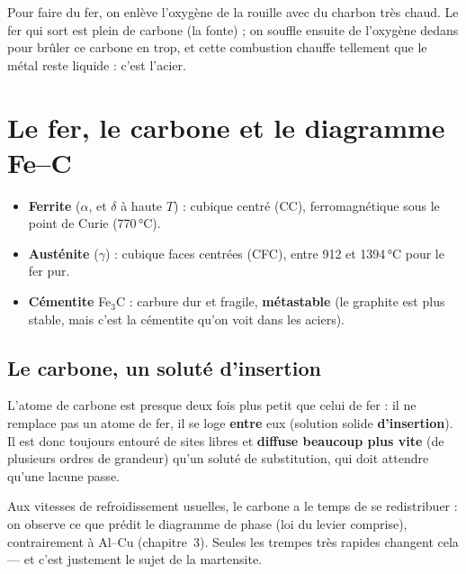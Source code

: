 \begin{goatbox}
Pour faire du fer, on enlève l'oxygène de la rouille avec du charbon très chaud. Le fer qui
sort est plein de carbone (la fonte) ; on souffle ensuite de l'oxygène dedans pour brûler ce
carbone en trop, et cette combustion chauffe tellement que le métal reste liquide : c'est
l'acier.
\end{goatbox}

\section{Le fer, le carbone et le diagramme Fe--C}


\begin{defnbox}[title={Les phases du fer}]
\begin{itemize}
  \item \textbf{Ferrite} ($\alpha$, et $\delta$ à haute $T$) : cubique centré (CC),
        ferromagnétique sous le point de Curie (770\,°C).
  \item \textbf{Austénite} ($\gamma$) : cubique faces centrées (CFC), entre 912 et 1394\,°C
        pour le fer pur.
  \item \textbf{Cémentite} Fe$_3$C : carbure dur et fragile, \textbf{métastable} (le graphite
        est plus stable, mais c'est la cémentite qu'on voit dans les aciers).
\end{itemize}
\end{defnbox}

\subsection*{Le carbone, un soluté d'insertion}

L'atome de carbone est presque deux fois plus petit que celui de fer : il ne remplace pas un
atome de fer, il se loge \textbf{entre} eux (solution solide \textbf{d'insertion}). Il est donc
toujours entouré de sites libres et \textbf{diffuse beaucoup plus vite} (de plusieurs ordres de
grandeur) qu'un soluté de substitution, qui doit attendre qu'une lacune passe.

\begin{propbox}[title={Conséquence : pas de microségrégation du carbone}]
Aux vitesses de refroidissement usuelles, le carbone a le temps de se redistribuer : on observe
ce que prédit le diagramme de phase (loi du levier comprise), contrairement à Al--Cu
(chapitre~3). Seules les trempes très rapides changent cela --- et c'est justement le sujet de
la martensite.
\end{propbox}


